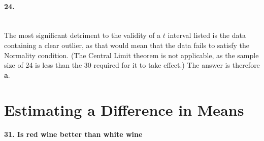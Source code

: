 \documentclass[../Homework]{subfiles}
\begin{document}
			\paragraph{24.}\ \\
				The most significant detriment to the validity of a $t$ interval listed is the data containing a clear outlier, as that would mean that the data fails to satisfy the Normality condition. (The Central Limit theorem is not applicable, as the sample size of 24 is less than the 30 required for it to take effect.) The answer is therefore \textbf{a}.
		\section{Estimating a Difference in Means}
			\paragraph{31. Is red wine better than white wine}
\end{document}
